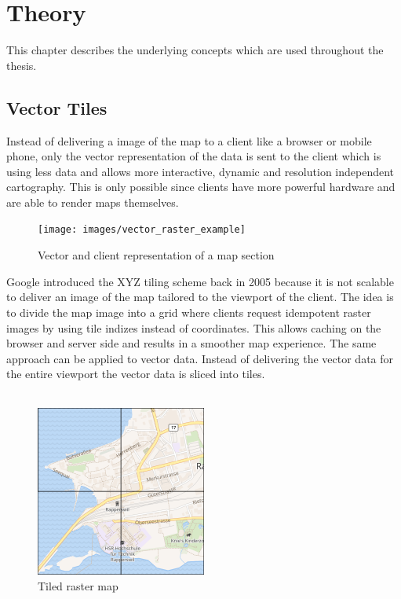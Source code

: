 \chapter{Theory}

This chapter describes the underlying concepts which are used throughout the thesis. 

\section{Vector Tiles}\label{part1_vector_tiles}

Instead of delivering a image of the map to a client like a browser or mobile phone, only the vector representation of the data is sent to the client which is using less data and allows more interactive, dynamic  and resolution independent cartography. This is only possible since clients have more powerful hardware and are able to render maps themselves.

\begin{figure}[H]
\centering
\texttt{[image: images/vector\_raster\_example]}
\caption{Vector and client representation of a map section}
\end{figure}

Google introduced the XYZ tiling scheme \cite{v_1_wiki.openstreetmap.org_2015} back in 2005 because it is not scalable to deliver an image of the map tailored to the viewport of the client.
The idea is to divide the map image into a grid where clients request idempotent raster images by using tile indizes instead of coordinates. This allows caching on the browser and server side and results in a smoother map experience.
The same approach can be applied to vector data. Instead of delivering the vector data for the entire viewport the vector data is sliced into tiles. \\\\

\begin{figure}[H]
\centering
\includegraphics[width=0.5\textwidth]{images/tiled_raster}
\caption{Tiled raster map}
\end{figure}

